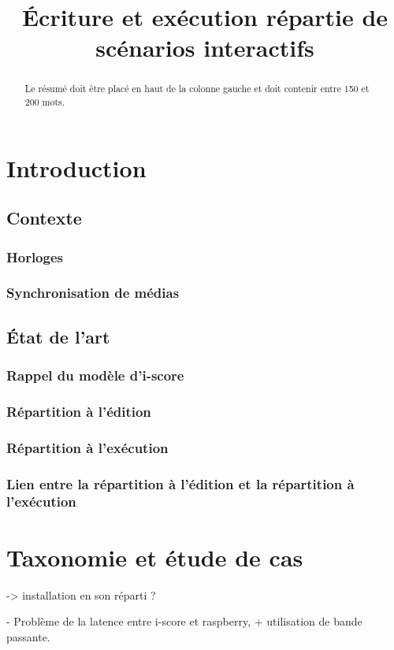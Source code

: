 \documentclass{article}
\title{Écriture et exécution répartie de scénarios interactifs}
\begin{document}
\maketitle
\begin{abstract}
Le résumé doit être placé en haut de la colonne gauche et doit contenir entre 150 et 200 mots.
\end{abstract}
\section{Introduction}
\subsection{Contexte}

\subsubsection{Horloges}
\subsubsection{Synchronisation de médias}
\subsection{État de l'art}
\subsubsection{Rappel du modèle d'i-score}
\subsubsection{Répartition à l'édition}
\subsubsection{Répartition à l'exécution}
\subsubsection{Lien entre la répartition à l'édition et la répartition à l'exécution}

\section{Taxonomie et étude de cas}
-> installation en son réparti ?

- Problème de la latence entre i-score et raspberry, + utilisation de bande passante.
\end{document}
